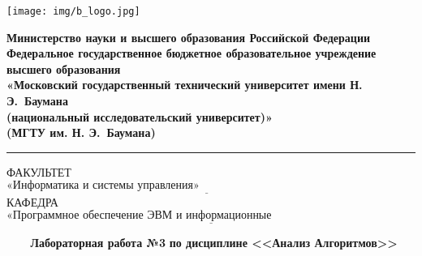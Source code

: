 \documentclass{bmstu}
\begin{document}
\renewcommand{\thelstlisting}{\arabic{lstlisting}}

\begin{titlepage}
	\fontsize{12pt}{12pt}\selectfont
	\noindent \begin{minipage}{0.15\textwidth}
		\texttt{[image: img/b\_logo.jpg]}
	\end{minipage}
	\noindent\begin{minipage}{0.9\textwidth}\centering
		\textbf{Министерство науки и высшего образования Российской Федерации}\\
		\textbf{Федеральное государственное бюджетное образовательное учреждение высшего образования}\\
		\textbf{«Московский государственный технический университет имени Н. Э.~Баумана}\\
		\textbf{(национальный исследовательский университет)»}\\
		\textbf{(МГТУ им. Н. Э.~Баумана)}
	\end{minipage}

	\noindent\rule{18cm}{3pt}
	\newline\newline
	\noindent ФАКУЛЬТЕТ $\underline{\text{«Информатика и системы управления»~~~~~~~~~~~~~~~~~~~~~~~~~~~~~~~~~~~~~~~~~~~~~~~~~~~~~~~}}$ \newline\newline
	\noindent КАФЕДРА $\underline{\text{«Программное обеспечение ЭВМ и информационные технологии»~~~~~~~~~~~~~~~~~~~~~~~}}$\newline\newline\newline\newline\newline\newline\newline


	\begin{center}
		\noindent\begin{minipage}{1.3\textwidth}\centering
		\Large\textbf{   ~~~ Лабораторная работа №3}\newline
		\textbf{по дисциплине <<Анализ Алгоритмов>>}\newline\newline\newline
		\end{minipage}
	\end{center}


\end{titlepage}
\end{document}
